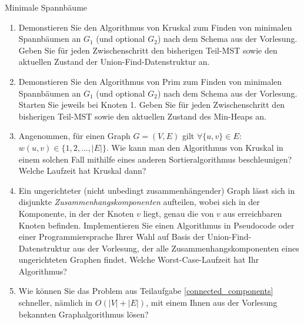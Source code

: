 \documentclass[11pt,a4paper]{article}
\begin{document}
\begin{aufgabe}{2}{Minimale Spannbäume}
\begin{figure}[h!]
\begin{subfigure}{0.34\textwidth}
        \end{subfigure}
    \end{figure}
    \FloatBarrier
    \begin{enumerate}[label=\alph*)]
        \item Demonstieren Sie den Algorithmus von Kruskal zum Finden von minimalen Spannbäumen an $G_1$ (und optional $G_2$) nach dem Schema aus der Vorlesung.
        Geben Sie für jeden Zwischenschritt den bisherigen Teil-MST sowie den aktuellen Zustand der Union-Find-Datenstruktur an.
        \item Demonstieren Sie den Algorithmus von Prim zum Finden von minimalen Spannbäumen an $G_1$ (und optional $G_2$) nach dem Schema aus der Vorlesung.
        Starten Sie jeweils bei Knoten 1.
        Geben Sie für jeden Zwischenschritt den bisherigen Teil-MST sowie den aktuellen Zustand des Min-Heaps an.
        \item Angenommen, für einen Graph $G=(V,E)$ gilt $\forall \{u, v\} \in E$: $w(u, v) \in \{1, 2, \ldots, |E|\}$.
        Wie kann man den Algorithmus von Kruskal in einem solchen Fall mithilfe eines anderen Sortieralgorithmus beschleunigen?
        Welche Laufzeit hat Kruskal dann?
        \item\label{connected_components}Ein ungerichteter (nicht unbedingt zusammenhängender) Graph lässt sich in disjunkte \emph{Zusammenhangskomponenten} aufteilen, wobei sich in der Komponente, in der der Knoten $v$ liegt, genau die von $v$ aus erreichbaren Knoten befinden.
        Implementieren Sie einen Algorithmus in Pseudocode oder einer Programmiersprache Ihrer Wahl auf Basis der Union-Find-Datenstruktur aus der Vorlesung, der alle Zusammenhangskomponenten eines ungerichteten Graphen findet.
        Welche Worst-Case-Laufzeit hat Ihr Algorithmus?
        \item
        Wie können Sie das Problem aus Teilaufgabe \ref*{connected_components} schneller, nämlich in $O(|V| + |E|)$, mit einem Ihnen aus der Vorlesung bekannten Graphalgorithmus lösen?
    \end{enumerate}
\end{aufgabe}
\end{document}
